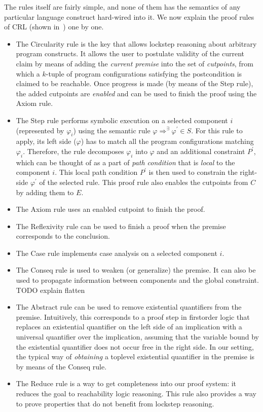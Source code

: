 The rules itself are fairly simple, and none of them has the semantics of any particular language construct
hard-wired into it.
We now explain the proof rules of CRL (shown in~) one by one.
\begin{itemize}
  \item The Circularity rule is the key that allows lockstep reasoning about arbitrary program constructs.
        It allows the user to postulate validity of the current claim by means of adding the \emph{current premise}
        into the set of \emph{cutpoints}, from which a $k$-tuple of program configurations satisfying the postcondition
        is claimed to be reachable. Once progress is made (by means of the Step rule), the added cutpoints are
        \emph{enabled} and can be used to finish the proof using the Axiom rule.
  \item The Step rule performs symbolic execution on a selected component $i$ (represented by $\varphi_i$)
        using the semantic rule $\varphi \Rightarrow^\exists \varphi^\prime \in S$.
        For this rule to apply, its left side ($\varphi$) has to match all the program configurations matching $\varphi_i$.
        Therefore, the rule decomposes $\varphi_i$ into $\varphi$ and an additional constraint $P^\prime$,
        which can be thought of as a part of \emph{path condition} that is \emph{local} to the component $i$.
        This local path condition $P^\prime$ is then used to constrain the right-side $\varphi^\prime$ of the selected rule.
        This proof rule also enables the cutpoints from $C$ by adding them to $E$.
  \item The Axiom rule uses an enabled cutpoint to finish the proof.
  \item The Reflexivity rule can be used to finish a proof when the premise corresponds to the conclusion.
  \item The Case rule implements case analysis on a selected component $i$.
  \item The Conseq rule is used to weaken (or generalize) the premise. It can also be used
        to propagate information between components and the global constraint.
        TODO explain flatten
  \item The Abstract rule can be used to remove existential quantifiers from the premise.
        Intuitively, this corresponds to a proof step in firstorder logic that replaces
        an existential quantifier on the left side of an implication
        with a universal quantifier over the implication, assuming that the variable
        bound by the existential quantifier does not occur free in the right side.
        In our setting, the typical way of \emph{obtaining} a toplevel existential quantifier in the premise
        is by means of the Conseq rule.
  \item The Reduce rule is a way to get completeness into our proof system:
        it reduces the goal to reachability logic reasoning.
        This rule also provides a way to prove properties that do not benefit
        from lockstep reasoning.

\end{itemize}


